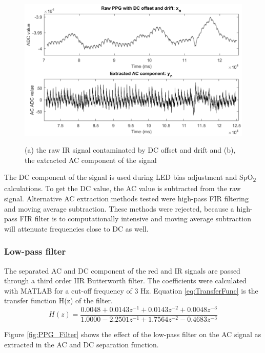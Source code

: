 \begin{figure}[H]
   \centering
   \includegraphics[width=12cm,height=7.5cm]{figs/AC_Extraction.png}
   \caption{(a) the raw IR signal contaminated by DC offset and drift and (b), the extracted AC component of the signal}
   \label{fig:AC_Extraction}
\end{figure}

The DC component of the signal is used during LED bias adjustment and SpO\textsubscript{2} calculations. To get the DC value, the AC value is subtracted from the raw signal. Alternative AC extraction methods tested were high-pass FIR filtering and moving average subtraction. These methods were rejected, because a high-pass FIR filter is to computationally intensive and moving average subtraction will attenuate frequencies close to DC as well.

\subsubsection{Low-pass filter}
The separated AC and DC component of the red and IR signals are passed through a third order IIR Butterworth filter. The coefficients were calculated with MATLAB for a cut-off frequency of 3 Hz. Equation \ref{eq:TransferFunc} is the transfer function H(z) of the filter.
\begin{equation}
\label{eq:TransferFunc}
H(z) = \frac{0.0048+0.0143z^{-1}+0.0143z^{-2}+0.0048z^{-3}}{1.0000-2.2501z^{-1}+1.7564z^{-2}-0.4683z^{-3}}
\end{equation}

Figure \ref{fig:PPG_Filter} shows the effect of the low-pass filter on the AC signal as extracted in the AC and DC separation function. 

